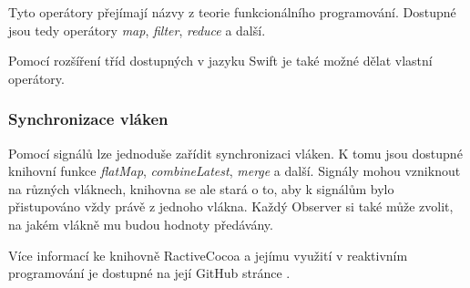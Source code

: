 Tyto operátory přejímají názvy z teorie funkcionálního programování.
Dostupné jsou tedy operátory \textit{map}, \textit{filter}, \textit{reduce} a další.

Pomocí rozšíření tříd dostupných v jazyku Swift je také možné dělat vlastní operátory.

\subsubsection*{Synchronizace vláken}

Pomocí signálů lze jednoduše zařídit synchronizaci vláken.
K tomu jsou dostupné knihovní funkce \textit{flatMap}, \textit{combineLatest}, \textit{merge} a další.
Signály mohou vzniknout na různých vláknech, knihovna se ale stará o to, aby k signálům bylo přistupováno vždy právě z jednoho vlákna.
Každý Observer si také může zvolit, na jakém vlákně mu budou hodnoty předávány.

Více informací ke knihovně RactiveCocoa a jejímu využití v reaktivním programování je dostupné na její GitHub stránce \cite{github-reactivecocoa}.
